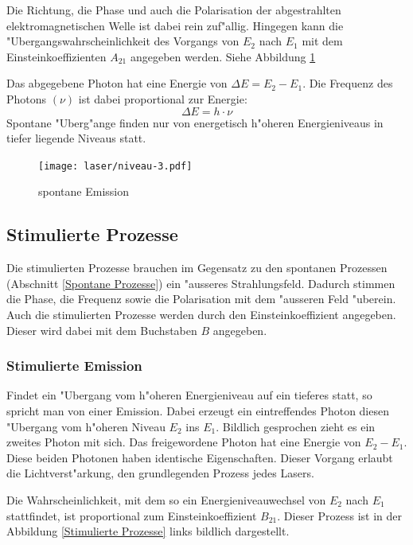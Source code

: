\begin{refsection}
Die Richtung, die Phase und auch die Polarisation der abgestrahlten
elektromagnetischen Welle ist dabei rein zuf"allig.
Hingegen kann die "Ubergangswahrscheinlichkeit des Vorgangs von $E_2$ nach
$E_1$ mit dem Einsteinkoeffizienten $A_{21}$ angegeben werden.
Siehe Abbildung \ref{spontane Emission}
%

Das abgegebene Photon hat eine Energie von $\Delta E = E_2 - E_1$.
Die Frequenz des Photons $(\nu)$ ist dabei proportional zur Energie:
\[ \Delta E = h\cdot \nu\]
Spontane "Uberg"ange finden nur von energetisch h"oheren Energieniveaus in
tiefer liegende Niveaus statt.

\begin{figure}
\centering
\texttt{[image: laser/niveau-3.pdf]}
\caption{spontane Emission}
\label{spontane Emission}
\end{figure}


\subsection{Stimulierte Prozesse}
Die stimulierten Prozesse brauchen im Gegensatz zu den spontanen
Prozessen (Abschnitt \ref{Spontane Prozesse}) ein "ausseres Strahlungsfeld.
Dadurch stimmen die Phase, die Frequenz sowie die Polarisation mit dem
"ausseren Feld "uberein.
Auch die stimulierten Prozesse werden durch den Einsteinkoeffizient angegeben.
Dieser wird dabei mit dem Buchstaben $B$ angegeben.

\subsubsection{Stimulierte Emission}
%
Findet ein "Ubergang vom h"oheren Energieniveau auf ein tieferes statt,
so spricht man von einer Emission.
Dabei erzeugt ein eintreffendes Photon diesen "Ubergang vom h"oheren Niveau
$E_2$ ins $E_1$. 
Bildlich gesprochen zieht es ein zweites Photon mit sich.
Das freigewordene Photon hat eine Energie von $E_2 - E_1$.
Diese beiden Photonen haben identische Eigenschaften.
Dieser Vorgang erlaubt die Lichtverst"arkung, den grundlegenden Prozess jedes
Lasers.

Die Wahrscheinlichkeit, mit dem so ein Energieniveauwechsel von $E_2$ nach
$E_1$ stattfindet, ist proportional zum Einsteinkoeffizient $B_{21}$.
Dieser Prozess ist in der Abbildung \ref{Stimulierte Prozesse} links bildlich
dargestellt.


\end{refsection}
